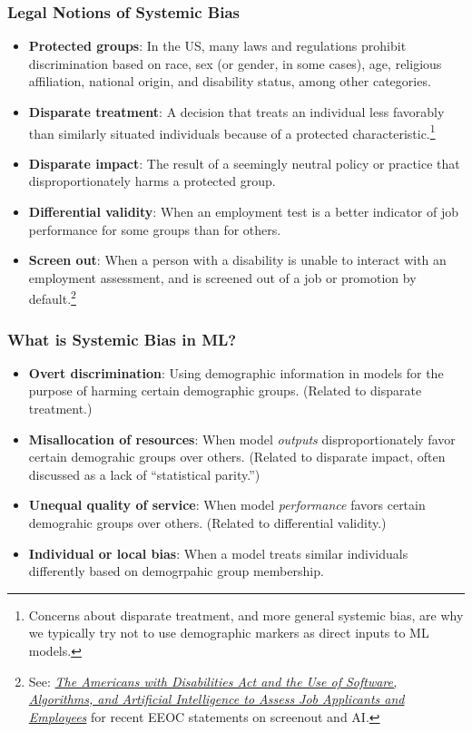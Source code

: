 \documentclass[11pt,aspectratio=169,hyperref={colorlinks}]{beamer}
\begin{document}
		\begin{frame}				
			
			\frametitle{Legal Notions of Systemic Bias}		
			
			\begin{itemize}\small
				\item \textbf{Protected groups}: In the US, many laws and regulations prohibit discrimination based on race, sex (or gender, in some cases), age, religious affiliation, national origin, and disability status, among other categories. 
				\item \textbf{Disparate treatment}: A decision that treats an individual less favorably than similarly situated individuals because of a protected characteristic.\footnote{Concerns about disparate treatment, and more general systemic bias, are why we typically try not to use demographic markers as direct inputs to ML models.}
				\item \textbf{Disparate impact}: The result of a seemingly neutral policy or practice that disproportionately harms a protected group. 
				\item \textbf{Differential validity}: When an employment test is a better indicator of job performance for some groups than for others.
				\item \textbf{Screen out}: When a person with a disability is unable to interact with an employment assessment, and is screened out of a job or promotion by default.\footnote{See: \href{https://www.eeoc.gov/laws/guidance/americans-disabilities-act-and-use-software-algorithms-and-artificial-intelligence}{\textit{The Americans with Disabilities Act and the Use of Software, Algorithms, and Artificial Intelligence to Assess Job Applicants and Employees}} for recent EEOC statements on screenout and AI.} 
			\end{itemize}
		\end{frame}
		
		\begin{frame}				

			\frametitle{What is Systemic Bias in ML?}

				\begin{itemize}
					\item \textbf{Overt discrimination}: Using demographic information in models for the purpose of harming certain demographic groups. (Related to disparate treatment.)
					\item \textbf{Misallocation of resources}: When model \textit{outputs} disproportionately favor certain demograhic groups over others. (Related to disparate impact, often discussed as a lack of ``statistical parity.'') 
					\item \textbf{Unequal quality of service}:  When model \textit{performance} favors certain demograhic groups over others. (Related to differential validity.)
					\item \textbf{Individual or local bias}: When a model treats similar individuals differently based on demogrpahic group membership. 
				\end{itemize}

		\end{frame}
\end{document}
